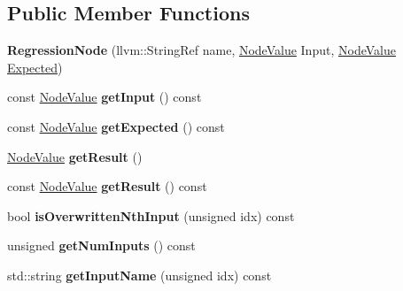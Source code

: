 \subsection*{Public Member Functions}
\begin{DoxyCompactItemize}
\item 
\mbox{\label{classglow_1_1_regression_node_afb756b5973ec97141883899fb3b2a68f}} 
{\bfseries Regression\+Node} (llvm\+::\+String\+Ref name, \hyperlink{structglow_1_1_node_value}{Node\+Value} Input, \hyperlink{structglow_1_1_node_value}{Node\+Value} \hyperlink{classglow_1_1detail_1_1_glow_expected}{Expected})
\item 
\mbox{\label{classglow_1_1_regression_node_aee1c2912eee85c64e81237a901e8d280}} 
const \hyperlink{structglow_1_1_node_value}{Node\+Value} {\bfseries get\+Input} () const
\item 
\mbox{\label{classglow_1_1_regression_node_a6fe3f4a0533a381aed33af6717595801}} 
const \hyperlink{structglow_1_1_node_value}{Node\+Value} {\bfseries get\+Expected} () const
\item 
\mbox{\label{classglow_1_1_regression_node_a8712cc6422d3ccfc087db41675443ccc}} 
\hyperlink{structglow_1_1_node_value}{Node\+Value} {\bfseries get\+Result} ()
\item 
\mbox{\label{classglow_1_1_regression_node_a7e274314a4008a2cbfa86e2b4b0b92be}} 
const \hyperlink{structglow_1_1_node_value}{Node\+Value} {\bfseries get\+Result} () const
\item 
\mbox{\label{classglow_1_1_regression_node_ad68552ba1d0dfb94f9b2fa4a81607c8c}} 
bool {\bfseries is\+Overwritten\+Nth\+Input} (unsigned idx) const
\item 
\mbox{\label{classglow_1_1_regression_node_ac4260f9d836400ad313db981aab4a1b2}} 
unsigned {\bfseries get\+Num\+Inputs} () const
\item 
\mbox{\label{classglow_1_1_regression_node_a24d51f6bf6106d198fe5b5685d90f127}} 
std\+::string {\bfseries get\+Input\+Name} (unsigned idx) const

\end{DoxyCompactItemize}

